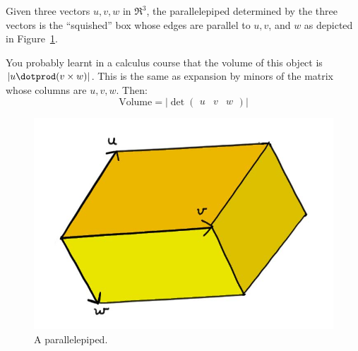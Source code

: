 Given three vectors $u,v,w$ in $\Re^3$, the parallelepiped determined by the three vectors is the ``squished'' box whose edges are parallel to $u, v$, and $w$ as depicted in Figure~\ref{parallelepiped}.

You probably learnt in a  calculus course  that the volume of this object is $|u\dotprod (v\times w)|$.  This is the same as expansion by minors of the matrix whose columns are $u,v,w$.  Then:
\[
\text{Volume}=\big|\det \begin{pmatrix}u & v & w \end{pmatrix} \big|
\] 



\begin{figure}
\begin{center}
\includegraphics[scale=.4]{parallelepiped.jpg}
\caption{A parallelepiped.\label{parallelepiped}}
\end{center}
\end{figure}








